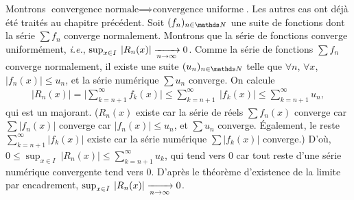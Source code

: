 \begin{prv}
	Montrons $\text{convergence normale} \implies \text{convergence uniforme}$. Les autres cas ont déjà été traités au chapitre précédent. 
	Soit $(f_n)_{n\in\N}$\/ une suite de fonctions dont la série $\sum f_n$\/ converge normalement. Montrons que la série de fonctions converge uniformément, \textit{i.e.}, $\sup_{x \in I}\:|R_n(x)| \xrightarrow[n\to \infty]{} 0$. Comme la série de fonctions $\sum f_n$\/ converge normalement, il existe une suite $(u_n)_{n\in\N}$\/ telle que $\forall n$, $\forall x$, $|f_n(x)| \le u_n$, et la série numérique $\sum u_n$\/ converge. On calcule
	\begin{align*}
		\big| R_n(x) \big| = \Big| \sum_{k=n+1}^{\infty} f_k(x) \Big| \le \sum_{k=n+1}^\infty\:|f_k(x)| \le \sum_{k=n+1}^\infty u_n,
	\end{align*}
	qui est un majorant.
	{\color{gray}($R_n(x)$\/ existe car la série de réels $\sum f_n(x)$\/ converge car  $\sum |f_n(x)|$\/ converge car $|f_n(x)| \le u_n$, et $\sum u_n$\/ converge. Également, le reste $\sum_{k=n+1}^{\infty}|f_k(x)|$\/ existe car la série numérique $\sum |f_k(x)|$\/ converge.)} D'où, $0 \le \sup_{x \in I}\:|R_n(x)| \le \sum_{k=n+1}^\infty u_k$, qui tend vers 0 car tout reste d'une série numérique convergente tend vers 0. D'après le théorème d'existence de la limite par encadrement, $\sup_{x \in I}\:|R_n(x)| \xrightarrow[n\to \infty]{} 0$.
\end{prv}

